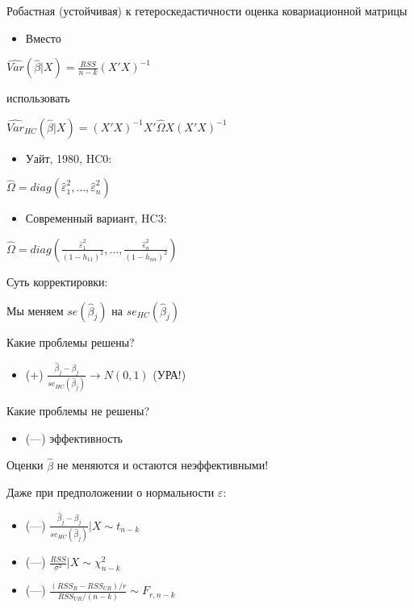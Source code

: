 \documentclass[ignorenonframetext,]{beamer}
\begin{document}
\begin{frame}{Робастная (устойчивая) к гетероскедастичности оценка
ковариационной матрицы}

\begin{itemize}
\itemsep1pt\parskip0pt
\item
  Вместо
\end{itemize}

$\widehat{Var}(\hat{\beta}|X)=\frac{RSS}{n-k}(X'X)^{-1}$

использовать

$\widehat{Var}_{HC}(\hat{\beta}|X)=(X'X)^{-1}X'\hat{\Omega}X(X'X)^{-1}$

\begin{itemize}
\itemsep1pt\parskip0pt
\item
  Уайт, 1980, HC0:
\end{itemize}

$\hat{\Omega}=diag( \hat{\varepsilon}_1^2, \ldots, \hat{\varepsilon}_n^2 )$

\begin{itemize}
\itemsep1pt\parskip0pt
\item
  Современный вариант, HC3:
\end{itemize}

$\hat{\Omega}=diag \left( \frac{\hat{\varepsilon}_1^2}{(1-h_{11})^2}, \ldots, \frac{\hat{\varepsilon}_n^2}{(1-h_{nn})^2} \right)$

\end{frame}

\begin{frame}{Суть корректировки:}

Мы меняем $se(\hat{\beta}_j)$ на $se_{HC}(\hat{\beta}_j)$

Какие проблемы решены?

\begin{itemize}
\itemsep1pt\parskip0pt
\item
  (+) $\frac{\hat{\beta}_j-\beta_j}{se_{HC}(\hat{\beta}_j)} \to N(0,1)$
  (УРА!)
\end{itemize}

\end{frame}

\begin{frame}{Какие проблемы не решены?}

\begin{itemize}
\itemsep1pt\parskip0pt
\item
  (---) эффективность
\end{itemize}

Оценки $\hat{\beta}$ не меняются и остаются неэффективными!

Даже при предположении о нормальности $\varepsilon$:

\begin{itemize}
\item
  (---)
  $\frac{\hat{\beta}_j-\beta_j}{se_{HC}(\hat{\beta}_j)} | X \sim t_{n-k}$
\item
  (---) $\frac{RSS}{\sigma^2} |X \sim \chi^2_{n-k}$
\item
  (---) $\frac{(RSS_R-RSS_{UR})/r}{RSS_{UR}/(n-k)} \sim F_{r,n-k}$
\end{itemize}

\end{frame}
\end{document}
